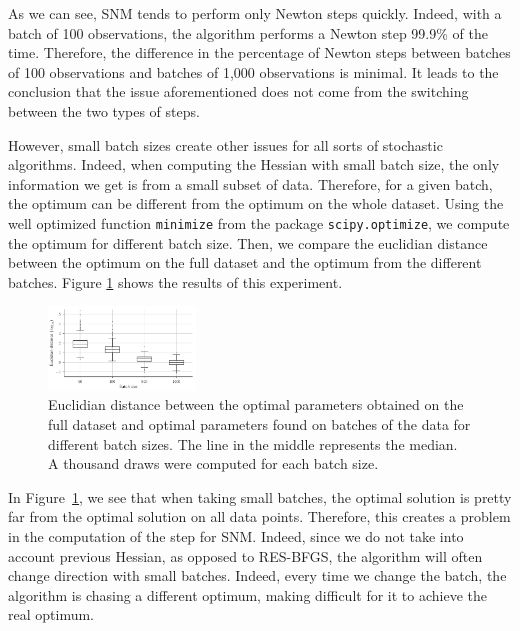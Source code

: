 \documentclass[conference]{IEEEtran}
\begin{document}
As we can see, SNM tends to perform only Newton steps quickly. Indeed, with a batch of 100 observations, the algorithm performs a Newton step 99.9\% of the time. Therefore, the difference in the percentage of Newton steps between batches of 100 observations and batches of 1,000 observations is minimal. It leads to the conclusion that the issue aforementioned does not come from the switching between the two types of steps.

However, small batch sizes create other issues for all sorts of stochastic algorithms. Indeed, when computing the Hessian with small batch size, the only information we get is from a small subset of data. Therefore, for a given batch, the optimum can be different from the optimum on the whole dataset. Using the well optimized function \texttt{minimize} from the package \texttt{scipy.optimize}, we compute the optimum for different batch size. Then, we compare the euclidian distance between the optimum on the full dataset and the optimum from the different batches. Figure \ref{fig:batch_dist} shows the results of this experiment.

\begin{figure}[t]
\centering
\includegraphics[width=0.35\textwidth]{../figures/dist.pdf}
\vspace{-0.3cm}
\caption{Euclidian distance between the optimal parameters obtained on the full dataset and optimal parameters found on batches of the data for different batch sizes. The line in the middle represents the median. A thousand draws were computed for each batch size.}
\label{fig:batch_dist}
\vspace{-0.5cm}
\end{figure}

In Figure~\ref{fig:batch_dist}, we see that when taking small batches, the optimal solution is pretty far from the optimal solution on all data points. Therefore, this creates a problem in the computation of the step for SNM. Indeed, since we do not take into account previous Hessian, as opposed to RES-BFGS, the algorithm will often change direction with small batches. Indeed, every time we change the batch, the algorithm is chasing a different optimum, making difficult for it to achieve the real optimum. 
\end{document}

